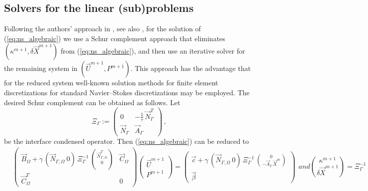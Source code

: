 \documentclass[a4paper,12pt,onecolumn]{article}
\newcommand{\NbulkT}{\vec{N}_{\Gamma,\Omega}^T}
\newcommand{\Nbulk}{\vec{N}_{\Gamma,\Omega}}
\begin{document}
\subsection{Solvers for the linear (sub)problems}
Following the authors' approach in \cite{stokesfitted}, see also
\cite{fluidfbp,spurious},
for the solution of (\ref{eq:ns_algebraic}) we use a Schur complement
approach that eliminates $(\kappa^{m+1}, \delta \vec X^{m+1})$ from
(\ref{eq:ns_algebraic}), and then use an iterative solver for the remaining
system in $(\vec U^{m+1}, P^{m+1})$. This approach has the advantage that for
the reduced system well-known solution methods for finite element
discretizations for standard Navier--Stokes discretizations may be employed.
The desired Schur complement can be obtained as follows. Let
\begin{equation} \label{eq:Xi}
\Xi_\Gamma:= \begin{pmatrix}
 0 & - \frac1{\tau}\,\vec N_\Gamma^T \\
\vec N_\Gamma & \vec A_\Gamma
\end{pmatrix} \,,
\end{equation}
be the interface condensed operator. Then (\ref{eq:ns_algebraic}) can be
reduced to
\begin{subequations}
\begin{align}\label{eq:SchurkX}
&
\begin{pmatrix}
\vec B_\Omega + \gamma\,(\Nbulk \ 0)\,\Xi_\Gamma^{-1}\,
\binom{\NbulkT}{0} & \vec C_\Omega \\
\vec C_\Omega^T & 0
\end{pmatrix}
\begin{pmatrix}
\vec U^{m+1} \\ P^{m+1}
\end{pmatrix}
= %
\begin{pmatrix}
\vec c
+\gamma\,(\Nbulk \ 0)\, \Xi_\Gamma^{-1}\,
\binom{0}{-\vec A_\Gamma\,\vec X^m} \\
\vec \beta
\end{pmatrix}
\end{align}
and
\begin{equation}
\binom{\kappa^{m+1}}{\delta\vec X^{m+1}} = \Xi_\Gamma^{-1}\,
\binom{-\NbulkT\,\vec U^{m+1}}{-\vec A_\Gamma\,\vec X^m}\,.
\label{eq:SchurkXb}
\end{equation}
\end{subequations}
\end{document}
